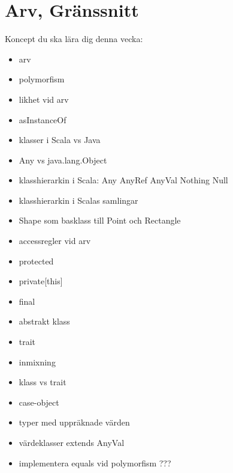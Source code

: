 \chapter{Arv, Gränssnitt}\label{chapter:W07}
Koncept du ska lära dig denna vecka:
\begin{multicols}{2}\begin{itemize}[nosep,label={$\square$},leftmargin=*]
\item arv
\item polymorfism
\item likhet vid arv
\item asInstanceOf
\item klasser i Scala vs Java
\item Any vs java.lang.Object
\item klasshierarkin i Scala: Any AnyRef AnyVal Nothing Null
\item klasshierarkin i Scalas samlingar
\item Shape som basklass till Point och Rectangle
\item accessregler vid arv
\item protected
\item private[this]
\item final
\item abstrakt klass
\item trait
\item inmixning
\item klass vs trait
\item case-object
\item typer med uppräknade värden
\item värdeklasser extends AnyVal
\item implementera equals vid polymorfism ???\end{itemize}\end{multicols}
